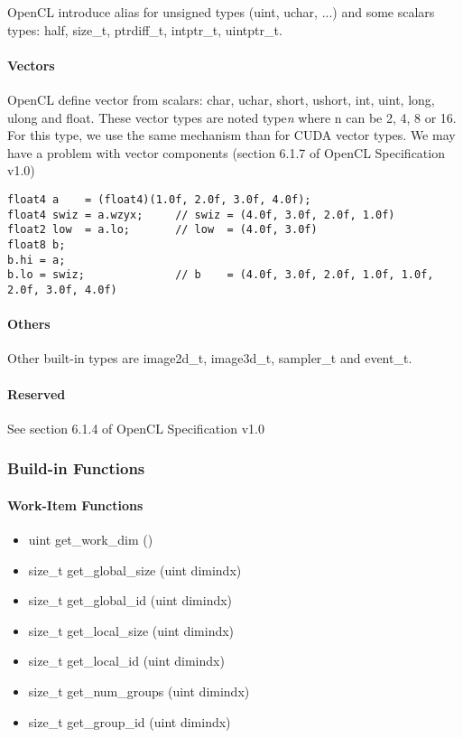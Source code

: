 OpenCL introduce alias for unsigned types (uint, uchar, ...) and some scalars types: half, size\_t, ptrdiff\_t, intptr\_t, uintptr\_t.

				\paragraph{Vectors}
				
OpenCL define vector from scalars: char, uchar, short, ushort, int, uint, long, ulong and float. These vector types are noted type\emph{n} where n can
be 2, 4, 8 or 16.
For this type, we use the same mechanism than for CUDA vector types. {\color{red} We may have a problem with vector components (section 6.1.7 
of OpenCL Specification v1.0)}
\begin{verbatim}
float4 a    = (float4)(1.0f, 2.0f, 3.0f, 4.0f);
float4 swiz = a.wzyx;     // swiz = (4.0f, 3.0f, 2.0f, 1.0f)
float2 low  = a.lo;       // low  = (4.0f, 3.0f)
float8 b;
b.hi = a;
b.lo = swiz;              // b    = (4.0f, 3.0f, 2.0f, 1.0f, 1.0f, 2.0f, 3.0f, 4.0f)
\end{verbatim}

				\paragraph{Others}

Other built-in types are image2d\_t, image3d\_t, sampler\_t and event\_t.

				\paragraph{Reserved}

See section 6.1.4 of OpenCL Specification v1.0

			\subsubsection{Build-in Functions}
			
				\paragraph{Work-Item Functions}
				
\begin{itemize}
	\item uint get\_work\_dim ()
	\item size\_t get\_global\_size (uint dimindx)
	\item size\_t get\_global\_id (uint dimindx)
	\item size\_t get\_local\_size (uint dimindx)
	\item size\_t get\_local\_id (uint dimindx)
	\item size\_t get\_num\_groups (uint dimindx)
	\item size\_t get\_group\_id (uint dimindx)
\end{itemize}
			
